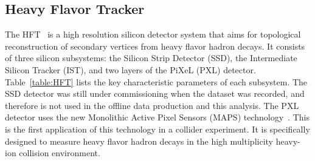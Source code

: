 \documentclass[%
 reprint,	
 amsmath,amssymb,
 aps,
 prc,
]{revtex4-1}
\begin{document}
\subsection{Heavy Flavor Tracker}
\label{dataset:hft}

The HFT~\cite{Contin:2017mck} is a high resolution silicon detector system that aims for topological reconstruction of secondary vertices from heavy flavor hadron decays. It consists of three silicon subsystems: the Silicon Strip Detector (SSD), the Intermediate Silicon Tracker (IST), and two layers of the PiXeL (PXL) detector. 
Table~\ref{table:HFT} lists the key characteristic parameters of each subsystem. The SSD detector was still under commissioning when the dataset was recorded, and therefore is not used in the offline data production and this analysis.
The PXL detector uses the new Monolithic Active Pixel Sensors (MAPS) technology~\cite{Contin:2017mck}. This is the first application of this technology in a collider experiment. It is specifically designed to measure heavy flavor hadron decays in the high multiplicity heavy-ion collision environment.

\begin{table}[t]
\end{table}
\end{document}
